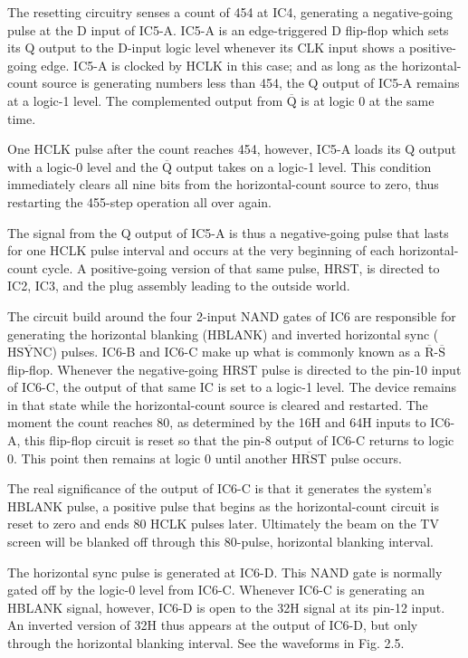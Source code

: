 \documentclass[11pt]{book}              %
\newcommand{\NOT}[1]{$\overline{\mbox{#1}}$}
\begin{document}
The resetting circuitry senses a count of 454 at IC4, generating a negative-going pulse at the D input of IC5-A. IC5-A is an edge-triggered D flip-flop which sets its Q output to the D-input logic level whenever its CLK input shows a positive-going edge. IC5-A is clocked by HCLK in this case; and as long as the horizontal-count source is generating numbers less than 454, the Q output of IC5-A remains at a logic-1 level. The complemented output from \NOT{Q} is at logic 0 at the same time.

One HCLK pulse after the count reaches 454, however, IC5-A loads its Q output with a logic-0 level and the \NOT{Q} output takes on a logic-1 level. This condition immediately clears all nine bits from the horizontal-count source to zero, thus restarting the 455-step operation all over again.

The signal from the Q output of IC5-A is thus a negative-going pulse that lasts for one HCLK pulse interval and occurs at the very beginning of each horizontal-count cycle. A positive-going version of that same pulse, HRST, is directed to IC2, IC3, and the plug assembly leading to the outside world.

The circuit build around the four 2-input NAND gates of IC6 are responsible for generating the horizontal blanking (HBLANK) and inverted horizontal sync (\NOT{HSYNC}) pulses. IC6-B and IC6-C make up what is commonly known as a \NOT{R}-\NOT{S} flip-flop. Whenever the negative-going HRST pulse is directed to the pin-10 input of IC6-C, the output of that same IC is set to a logic-1 level. The device remains in that state while the horizontal-count source is cleared and restarted. The moment the count reaches 80, as determined by the 16H and 64H inputs to IC6-A, this flip-flop circuit is reset so that the pin-8 output of IC6-C returns to logic 0. This point then remains at logic 0 until another \NOT{HRST} pulse occurs.

The real significance of the output of IC6-C is that it generates the system’s HBLANK pulse, a positive pulse that begins as the horizontal-count circuit is reset to zero and ends 80 HCLK pulses later. Ultimately the beam on the TV screen will be blanked off through this 80-pulse, horizontal blanking interval.

The horizontal sync pulse is generated at IC6-D. This NAND gate is normally gated off by the logic-0 level from IC6-C. Whenever IC6-C is generating an HBLANK signal, however, IC6-D is open to the 32H signal at its pin-12 input. An inverted version of 32H thus appears at the output of IC6-D, but only through the horizontal blanking interval. See the waveforms in Fig. 2.5.
\end{document}

